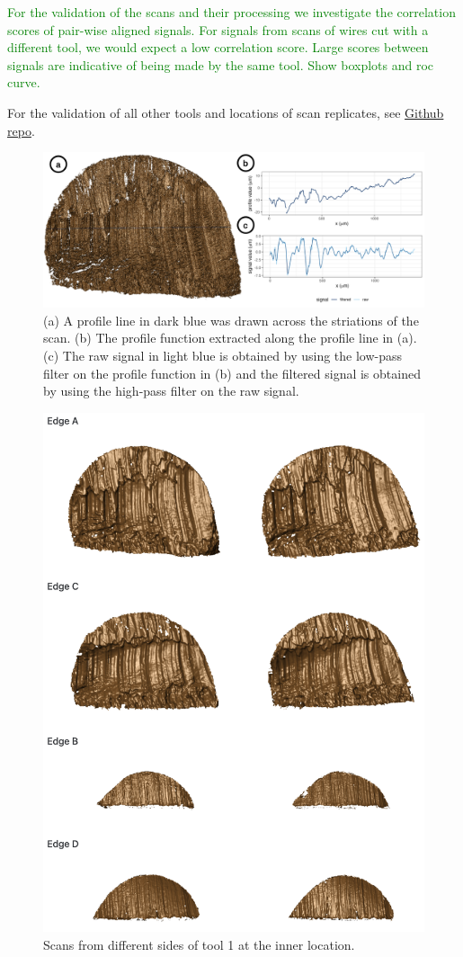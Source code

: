 \documentclass[fleqn,10pt]{wlscirep}
\newcommand{\hh}[1]{{\textcolor{Green}{#1}}}
\begin{document}
\hh{For the validation of the scans and their processing we investigate the correlation scores of pair-wise aligned signals. For signals from scans of wires cut with a different tool, we would expect a low correlation score. Large scores between signals are indicative of being made by the same tool. 
Show boxplots and roc curve. }

For the validation of all other tools and locations of scan replicates,
see
\href{https://heike.github.io/Wirecuts/data-descriptor/README.md}{Github repo}.

\begin{figure}[ht]
\centering
\includegraphics[width=0.9\linewidth]{T1AW-LI-R1-profiles-signals.png}
\caption{(a) A profile line in dark blue was drawn across the striations of the scan. (b) The profile function extracted along the profile line in (a). (c) The raw signal in light blue is obtained by using the low-pass filter on the profile function in (b) and the filtered signal is obtained by using the high-pass filter on the raw signal.}
\label{fig-T1AW-LI-R1-profiles-signals}
\end{figure}

\begin{figure}[ht]
\centering
\includegraphics[width=0.8\linewidth]{scans_pair.png}
\caption{Scans from different sides of tool 1 at the inner location.}
\label{fig-scans-pair}
\end{figure}
\end{document}
